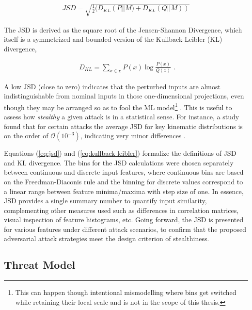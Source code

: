 \begin{equation}
\begin{split}
JSD = \sqrt{\frac{1}{2} ( D_{KL}\left( P \vert\vert M)+D_{KL}(Q \vert\vert M)\right)}
\end{split}
\label{eq:jsd}
\end{equation}

The JSD is derived as the square root of the Jensen-Shannon Divergence, which itself is a symmetrized and bounded version of the Kullback-Leibler (KL) divergence,

\begin{equation}
\begin{split}
D_{KL}=\sum_{x\in\chi} P(x) \log{\frac{P(x)}{Q(x)}}
\end{split}
\label{eq:kullback-leibler}.
\end{equation}

A low JSD (close to zero) indicates that the perturbed inputs are almost indistinguishable from nominal inputs in those one-dimensional projections, even though they may be arranged so as to fool the ML  model\footnote{This can happen though intentional mismodelling where bins get switched while retaining their local scale and is not in the scope of this thesis.} \cite{saala2025enforcingfundamentalrelationsadversarial}. This is useful to assess how \textit{stealthy} a given attack is in a statistical sense. For instance, a study found that for certain attacks the average JSD for key kinematic distributions is on the order of $\mathcal{O}(10^{-3})$, indicating very minor differences \cite{saala2025enforcingfundamentalrelationsadversarial}. 

Equations (\ref{eq:jsd}) and (\ref{eq:kullback-leibler}) formalize the definitions of JSD and KL divergence. The bins for the JSD calculations were chosen separately between continuous and discrete input features, where continuous bins are based on the Freedman-Diaconis rule \cite{Freedman1981} and the binning for discrete values correspond to a linear range between feature minima/maxima with step size of one. In essence, JSD provides a single summary number to quantify input similarity, complementing other measures used such as differences in correlation matrices, visual inspection of feature histograms, etc. Going forward, the JSD is presented for various features under different attack scenarios, to confirm that the proposed adversarial attack strategies meet the design criterion of stealthiness.

\subsection*{Threat Model}

